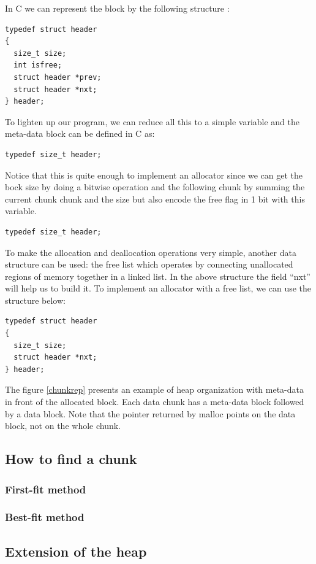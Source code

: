 In C we can represent the block by the following structure :
\begin{lstlisting}
typedef struct header
{
  size_t size;
  int isfree;
  struct header *prev;
  struct header *nxt;
} header;
\end{lstlisting}

To lighten up our program, we can reduce all this to a simple variable and the meta-data block can be defined in C as:
\begin{lstlisting}
typedef size_t header;
\end{lstlisting}
Notice that this is quite enough to implement an allocator since we can get the bock size by doing a bitwise operation and the following chunk by summing the current chunk chunk and the size but also encode the free flag in 1 bit with this variable.
\begin{lstlisting}
typedef size_t header;
\end{lstlisting}

To make the allocation and deallocation operations very simple, another data structure can be used: the free list which operates by connecting unallocated regions of memory together in a linked list. In the above structure  the field ``nxt'' will help us to build it.
To implement an allocator with a free list, we can use the structure below:
\begin{lstlisting}
typedef struct header
{
  size_t size;			
  struct header *nxt;
} header;
\end{lstlisting}

The figure \ref{chunkrep} presents an example of heap organization with meta-data in front of the allocated block. Each data chunk has a meta-data block followed by a data block. Note that the pointer returned by malloc points on the data block, not on the whole chunk.\\

\subsection{How to find a chunk}

\subsubsection{First-fit method}

\subsubsection{Best-fit method}

\subsection{Extension of the heap}